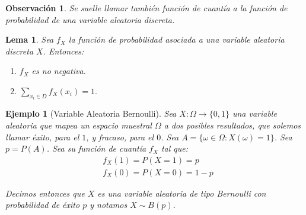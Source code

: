 \documentclass{report}
\newtheorem{lem}{Lema}[section]
\newtheorem{obs}{Observación}[section]
\newtheorem{ej}{Ejemplo}[section]
\begin{document}
\begin{obs}
    Se suelle llamar también \emph{función de cuantía} a la función de probabilidad de una variable aleatoria discreta.
\end{obs}

\begin{lem}
    Sea $f_X$ la función de probabilidad asociada a una variable aleatoria discreta $X$. Entonces:
    \begin{enumerate}
        \item $f_X$ es no negativa.
        \item $\displaystyle\sum_{x_i\in D} f_X(x_i) = 1.$
    \end{enumerate}
\end{lem}


\begin{ej}[Variable Aleatoria Bernoulli]
    Sea $X:\Omega \rightarrow \{0,1\}$ una variable aleatoria que mapea un espacio muestral $\Omega$ a dos posibles resultados, que solemos llamar
    \emph{éxito}, para el $1$, y \emph{fracaso}, para el $0$. Sea $A=\{\omega \in\Omega: X(\omega)=1\}$. Sea $p=P(A)$. Sea su función de cuantía $f_X$ tal que:
    \begin{equation*}
        \begin{split}
            &f_X(1) = P(X=1) = p\\
            &f_X(0) = P(X=0) = 1-p
        \end{split}
    \end{equation*}
    
    Decimos entonces que $X$ es una variable aleatoria de tipo Bernoulli con probabilidad de éxito $p$ y notamos $X\sim B(p)$.
\end{ej}
\end{document}
